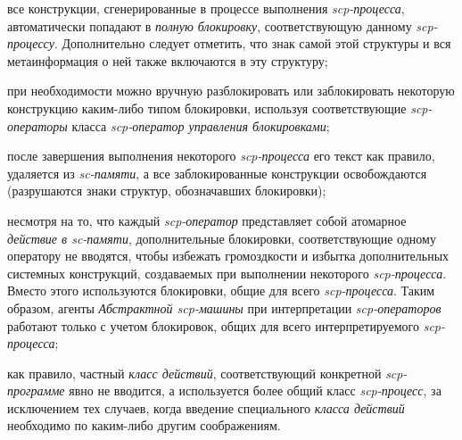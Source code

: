 \begin{frame}{}
\topline
\justifying
\vspace{10mm}	

\begin{textitemize}
\item все конструкции, сгенерированные в процессе выполнения \textit{scp-процесса}, автоматически попадают в \textit{полную 	блокировку}, соответствующую данному \textit{scp-процессу}. Дополнительно следует отметить, что знак самой этой структуры и вся метаинформация о ней также включаются в эту структуру;
\item при необходимости можно вручную разблокировать или заблокировать некоторую конструкцию каким-либо типом блокировки, используя соответствующие \textit{scp-операторы} класса \textit{scp-оператор управления блокировками};
\item после завершения выполнения некоторого \textit{scp-процесса} его текст как правило, удаляется из \textit{\mbox{sc-памяти}}, а все заблокированные конструкции освобождаются (разрушаются знаки структур, обозначавших блокировки);
\end{textitemize}
\end{frame}

\begin{frame}{}
\topline
\justifying
\vspace{10mm}

\begin{textitemize}
\item несмотря на то, что каждый \textit{scp-оператор} представляет собой атомарное \textit{действие в sc-памяти}, дополнительные блокировки, соответствующие одному оператору не вводятся, чтобы избежать громоздкости и избытка дополнительных системных конструкций, создаваемых при выполнении некоторого \textit{scp-процесса}. Вместо этого используются блокировки, общие для всего \textit{scp-процесса}. Таким образом, агенты \textit{Абстрактной scp-машины} при интерпретации \textit{scp-операторов} работают только с учетом блокировок, общих для всего интерпретируемого \textit{scp-процесса};
\item как правило, частный \textit{класс действий}, соответствующий конкретной \textit{scp-программе} явно не вводится, а используется более общий класс \textit{scp-процесс}, за исключением тех случаев, когда введение специального \textit{класса действий} необходимо по каким-либо другим соображениям.
\end{textitemize}
\end{frame}